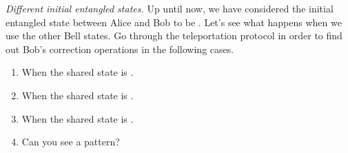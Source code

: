 \begin{exercise}
\emph{Different initial entangled states.} Up until now, we have considered the initial entangled state between Alice and Bob to be \ket{\Phi^+}. Let's see what happens when we use the other Bell states. Go through the teleportation protocol in order to find out Bob's correction operations in the following cases.
\begin{enumerate}[label=(\alph*)]
    \item When the shared state is \ket{\Phi^-}.
    \item When the shared state is \ket{\Psi^+}.
    \item When the shared state is \ket{\Psi^-}.
    \item Can you see a pattern?
\end{enumerate}
\end{exercise}
